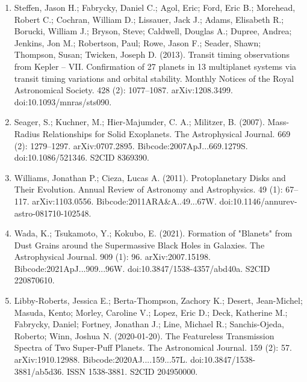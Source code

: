 \begin{enumerate}
\item Steffen, Jason H.; Fabrycky, Daniel C.; Agol, Eric; Ford, Eric B.; Morehead, Robert C.; Cochran, William D.; Lissauer, Jack J.; Adams, Elisabeth R.; Borucki, William J.; Bryson, Steve; Caldwell, Douglas A.; Dupree, Andrea; Jenkins, Jon M.; Robertson, Paul; Rowe, Jason F.; Seader, Shawn; Thompson, Susan; Twicken, Joseph D. (2013). Transit timing observations from Kepler – VII. Confirmation of 27 planets in 13 multiplanet systems via transit timing variations and orbital stability. Monthly Notices of the Royal Astronomical Society. 428 (2): 1077–1087. arXiv:1208.3499. doi:10.1093/mnras/sts090.
\item Seager, S.; Kuchner, M.; Hier-Majumder, C. A.; Militzer, B. (2007). Mass-Radius Relationships for Solid Exoplanets. The Astrophysical Journal. 669 (2): 1279–1297. arXiv:0707.2895. Bibcode:2007ApJ...669.1279S. doi:10.1086/521346. S2CID 8369390.
\item Williams, Jonathan P.; Cieza, Lucas A. (2011). Protoplanetary Disks and Their Evolution. Annual Review of Astronomy and Astrophysics. 49 (1): 67–117. arXiv:1103.0556. Bibcode:2011ARA&A..49...67W. doi:10.1146/annurev-astro-081710-102548.
\item Wada, K.; Tsukamoto, Y.; Kokubo, E. (2021). Formation of "Blanets" from Dust Grains around the Supermassive Black Holes in Galaxies. The Astrophysical Journal. 909 (1): 96. arXiv:2007.15198. Bibcode:2021ApJ...909...96W. doi:10.3847/1538-4357/abd40a. S2CID 220870610.
\item Libby-Roberts, Jessica E.; Berta-Thompson, Zachory K.; Desert, Jean-Michel; Masuda, Kento; Morley, Caroline V.; Lopez, Eric D.; Deck, Katherine M.; Fabrycky, Daniel; Fortney, Jonathan J.; Line, Michael R.; Sanchis-Ojeda, Roberto; Winn, Joshua N. (2020-01-20). The Featureless Transmission Spectra of Two Super-Puff Planets. The Astronomical Journal. 159 (2): 57. arXiv:1910.12988. Bibcode:2020AJ....159...57L. doi:10.3847/1538-3881/ab5d36. ISSN 1538-3881. S2CID 204950000.
\end{enumerate}
